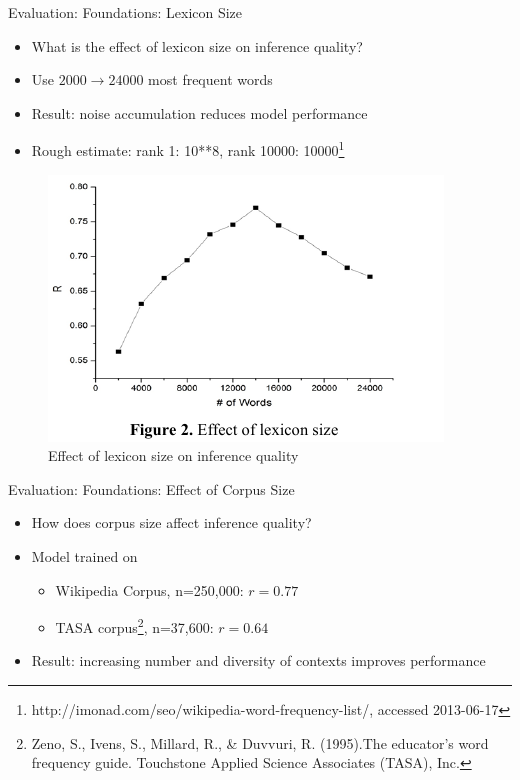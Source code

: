 \documentclass[12pt,a4paper]{beamer}
\begin{document}
\begin{frame}{Evaluation: Foundations: Lexicon Size}
\begin{itemize}
\item What is the effect of lexicon size on inference quality?
\item Use $2000 \to 24000$ most frequent words
\item Result: noise accumulation reduces model performance
\item Rough estimate: rank 1: 10**8, rank 10000: 10000\footnote{http://imonad.com/seo/wikipedia-word-frequency-list/, accessed 2013-06-17}
\end{itemize}
\begin{figure}
\includegraphics[scale=0.8]{figure_2_effect_of_lexicon_size.png}
\caption{Effect of lexicon size on inference quality}
\end{figure}
\end{frame}


\begin{frame}{Evaluation: Foundations: Effect of Corpus Size}
\begin{itemize}
\item How does corpus size affect inference quality?
\item Model trained on
    \begin{itemize}
    \item Wikipedia Corpus, n=250,000: $r = 0.77$
    \item TASA corpus\footnote{Zeno, S., Ivens, S., Millard, R., \& Duvvuri, R. (1995).The educator’s word frequency guide. Touchstone Applied Science Associates (TASA), Inc.}, n=37,600: $r = 0.64$
%
%
    \end{itemize}
\item Result: increasing number and diversity of contexts improves performance
\end{itemize}
\end{frame}
\end{document}
